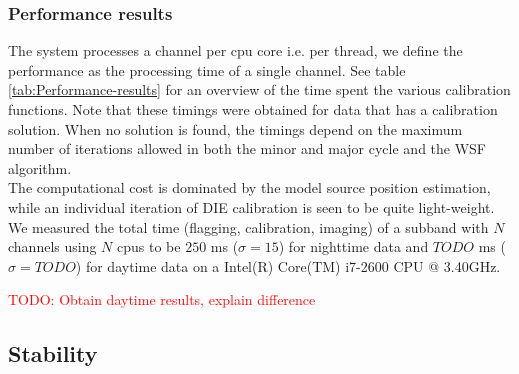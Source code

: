 \documentclass{aa}
\begin{document}
\subsubsection{Performance results}
The system processes a channel per cpu core i.e. per thread, we define the
performance as the processing time of a single channel. See table
\ref{tab:Performance-results} for an overview of the time spent the various
calibration functions. Note that these timings were obtained for data that has
a calibration solution. When no solution is found, the timings depend on the
maximum number of iterations allowed in both the minor and major cycle and the
WSF algorithm. \\
The computational cost is dominated by the model source position estimation,
while an individual iteration of DIE calibration is seen to be quite
light-weight. We measured the total time (flagging, calibration, imaging) of a
subband with $N$ channels using $N$ cpus to be $250$ ms ($\sigma = 15$) for
nighttime data and $TODO$ ms ($\sigma = TODO$) for daytime data on a Intel(R)
Core(TM) i7-2600 CPU @ 3.40GHz.
\begin{table}[tbh]

\caption{\label{tab:Performance-results} Overview of the time spent in
calibration function blocks for various datasets (daytime and nighttime). We
measured the overall time (flagging, calibrating, imaging) of an ACM to be
$250$ ms ($\sigma = 15$) for nighttime data and $1700$ ms ($\sigma 200$) for
daytime data using current generation hardware.}
\end{table}
\textcolor{red}{TODO: Obtain daytime results, explain difference}





\subsection{\label{sub:Stability}Stability}
\end{document}
